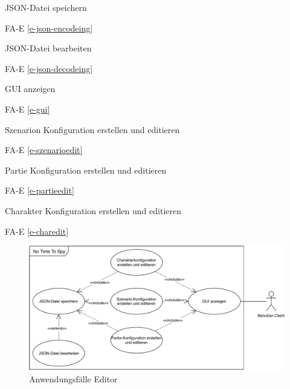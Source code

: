 JSON-Datei speichern

FA-E \ref{e-json-encodeing} %

JSON-Datei bearbeiten

FA-E \ref{e-json-decodeing} %

GUI anzeigen

FA-E \ref{e-gui} %

Szenarion Konfiguration erstellen und editieren

FA-E \ref{e-szenarioedit} %

Partie Konfiguration erstellen und editieren

FA-E \ref{e-partieedit} %

Charakter Konfiguration erstellen und editieren

FA-E \ref{e-charedit} %

\begin{figure}
  \centering
  \includegraphics[width=\textwidth]{Meilenstein02/use_case_editor.pdf}
  \caption{Anwendungsfälle Editor}
\end{figure}